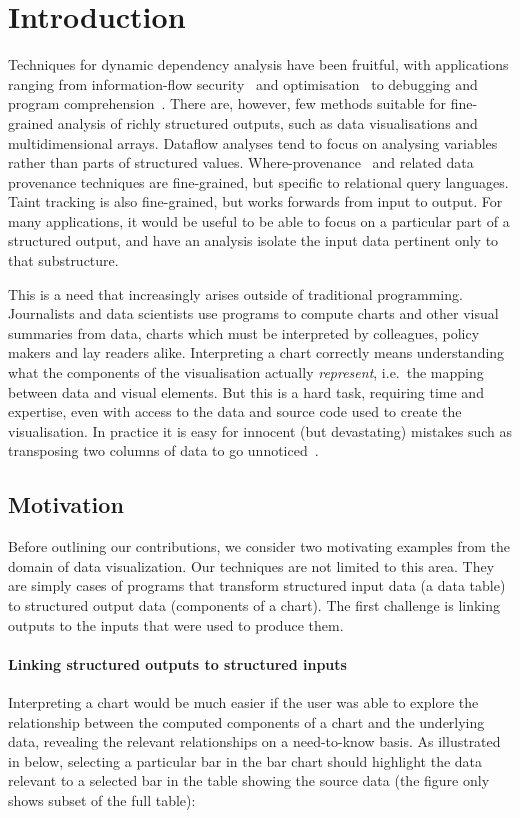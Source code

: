 \section{Introduction}
\label{sec:introduction}

Techniques for dynamic dependency analysis have been fruitful, with applications ranging from information-flow security~\cite{sabelfeld03} and optimisation~\cite{kildall73} to debugging and program comprehension~\cite{weiser81,delucia96}. There are, however, few methods suitable for fine-grained analysis of richly structured outputs, such as data visualisations and multidimensional arrays. Dataflow analyses \cite{reps95} tend to focus on analysing variables rather than parts of structured values. Where-provenance~\cite{buneman01} and related data provenance techniques are fine-grained, but specific to relational query languages. Taint tracking \cite{newsome05} is also fine-grained, but works forwards from input to output. For many applications, it would be useful to be able to focus on a particular part of a structured output, and have an analysis isolate the input data pertinent only to that substructure.

This is a need that increasingly arises outside of traditional programming. Journalists and data scientists use programs to compute charts and other visual summaries from data, charts which must be interpreted by colleagues, policy makers and lay readers alike. Interpreting a chart correctly means understanding what the components of the visualisation actually \emph{represent}, i.e.~the mapping between data and visual elements. But this is a hard task, requiring time and expertise, even with access to the data and source code used to create the visualisation. In practice it is easy for innocent (but devastating) mistakes such as transposing two columns of data to go unnoticed~\cite{miller06}.

\subsection{Motivation}
\label{sec:introduction:motivation}
Before outlining our contributions, we consider two motivating examples from the domain of data visualization. Our techniques are not limited to this area. They are simply cases of programs that transform structured input data (a data table) to structured output data (components of a chart). The first challenge is linking outputs to the inputs that were used to produce them.

\paragraph{Linking structured outputs to structured inputs}
Interpreting a chart would be much easier if the user was able to explore the relationship between the computed components of a chart and the underlying data, revealing the relevant relationships on a need-to-know basis. As illustrated in  below, selecting a particular bar in the bar chart should highlight the data relevant to a selected bar in the table showing the source data (the figure only shows subset of the full table):

